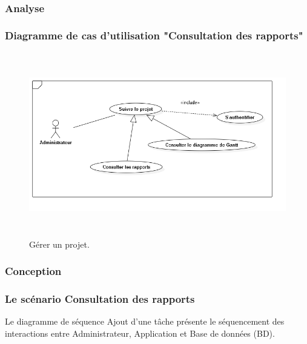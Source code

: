 


\
\subsubsection{Analyse}



\subsubsection{ Diagramme de cas d'utilisation "Consultation des rapports"}

\begin{figure}[H]
\center
\includegraphics[width=13cm,height=8cm]{./figures/ucS.png}
\caption{G\'{e}rer un projet.}

\end{figure}

\subsubsection{Conception}

\subsubsection{Le sc\'{e}nario \guillemotleft{} Consultation des rapports\guillemotright{}}
Le diagramme de s\'{e}quence \guillemotleft{} Ajout d'une t\^{a}che \guillemotright{} pr\'{e}sente le s\'{e}quencement
des interactions entre Administrateur, Application et Base de donn\'{e}es (BD).


